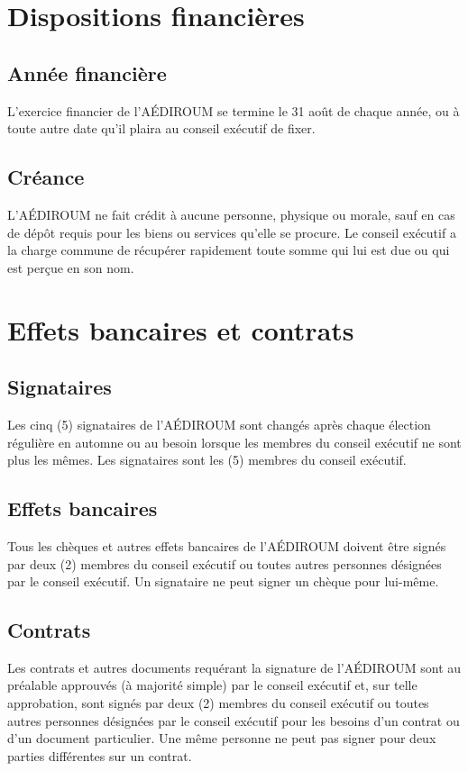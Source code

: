 \documentclass[12pt]{article}
\begin{document}
\section{Dispositions financières}
\subsection{Année financière}

L'exercice financier de l'AÉDIROUM se termine le 31 août de chaque année, ou à toute autre date qu'il plaira au conseil exécutif de fixer.

\subsection{Créance}

L'AÉDIROUM ne fait crédit à aucune personne, physique ou morale, sauf en cas de dépôt requis pour les biens ou services qu'elle se procure. Le conseil exécutif a la charge commune de récupérer rapidement toute somme qui lui est due ou qui est perçue en son nom.

\section{Effets bancaires et contrats}
\subsection{Signataires}
Les cinq (5) signataires de l'AÉDIROUM sont changés après chaque élection régulière en automne ou au besoin lorsque les membres du conseil exécutif ne sont plus les mêmes. Les signataires sont les (5) membres du conseil exécutif.

\subsection{Effets bancaires}

Tous les chèques et autres effets bancaires de l'AÉDIROUM doivent être signés par deux (2) membres du conseil exécutif ou toutes autres personnes désignées par le conseil exécutif. Un signataire ne peut signer un chèque pour lui-même.

\subsection{Contrats}

Les contrats et autres documents requérant la signature de l'AÉDIROUM sont au préalable approuvés (à majorité simple) par le conseil exécutif et, sur telle approbation, sont signés par deux (2) membres du conseil exécutif ou toutes autres personnes désignées par le conseil exécutif pour les besoins d'un contrat ou d'un document particulier. Une même personne ne peut pas signer pour deux parties différentes sur un contrat.
\end{document}
